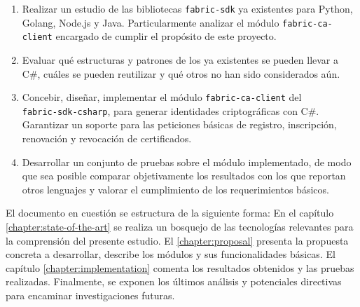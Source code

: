 \begin{enumerate}
	\item Realizar un estudio de las bibliotecas \texttt{fabric-sdk} ya existentes para Python, Golang, Node.js y Java. Particularmente analizar el m\'odulo \texttt{fabric-ca-client} encargado de cumplir el prop\'osito de este proyecto. 
	
	\item Evaluar qu\'e estructuras y patrones de los ya existentes se pueden llevar a C\#, cu\'ales se pueden reutilizar y qu\'e otros no han sido considerados a\'un.
	
	\item Concebir, dise\~nar, implementar el m\'odulo \texttt{fabric-ca-client} del
	\\
	\texttt{fabric-sdk-csharp}, para generar identidades criptogr\'aficas con C\#. Garantizar un soporte para las peticiones b\'asicas de registro, inscripci\'on, renovaci\'on y revocaci\'on de certificados.
	
	
	\item Desarrollar un conjunto de pruebas sobre el m\'odulo implementado, de modo que sea posible comparar objetivamente los resultados con los que reportan otros lenguajes y valorar el cumplimiento de los requerimientos b\'asicos.
\end{enumerate}

El documento en cuesti\'on se estructura de la siguiente forma: En el cap\'itulo \ref{chapter:state-of-the-art} se realiza un bosquejo de las tecnolog\'ias relevantes para la comprensi\'on del presente estudio. El \ref{chapter:proposal} presenta la propuesta concreta a desarrollar, describe los m\'odulos y sus funcionalidades b\'asicas. El cap\'itulo \ref{chapter:implementation} comenta los resultados obtenidos y las pruebas realizadas. Finalmente, se exponen los \'ultimos an\'alisis y potenciales directivas para encaminar investigaciones futuras.



